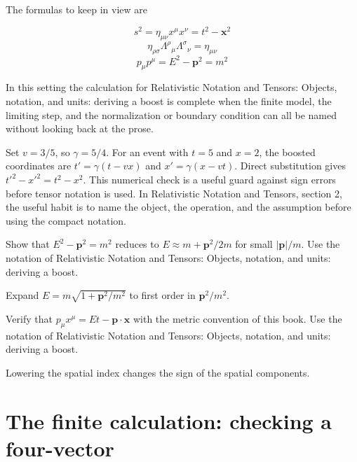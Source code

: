 The formulas to keep in view are

\[
  s^2=\eta_{\mu\nu}x^\mu x^\nu=t^2-\bm x^2
\]
\[
  \eta_{\rho\sigma}\Lambda^\rho{}_\mu\Lambda^\sigma{}_\nu=\eta_{\mu\nu}
\]
\[
  p_\mu p^\mu=E^2-\bm p^2=m^2
\]

In this setting the calculation for Relativistic Notation and Tensors: Objects, notation, and units: deriving a boost is complete when the finite model, the limiting step, and the normalization or boundary condition can all be named without looking back at the prose.




\begin{example}
Set \(v=3/5\), so \(\gamma=5/4\).  For an event with \(t=5\) and \(x=2\), the boosted coordinates are \(t'=\gamma(t-vx)\) and \(x'=\gamma(x-vt)\).  Direct substitution gives \(t'^2-x'^2=t^2-x^2\).  This numerical check is a useful guard against sign errors before tensor notation is used.  In Relativistic Notation and Tensors, section 2, the useful habit is to name the object, the operation, and the assumption before using the compact notation.
\end{example}



\begin{exercise}
Show that \(E^2-\bm p^2=m^2\) reduces to \(E\approx m+\bm p^2/2m\) for small \(|\bm p|/m\).  Use the notation of Relativistic Notation and Tensors: Objects, notation, and units: deriving a boost.
\begin{answer}
Expand \(E=m\sqrt{1+\bm p^2/m^2}\) to first order in \(\bm p^2/m^2\).
\end{answer}
\end{exercise}

\begin{exercise}
Verify that \(p_\mu x^\mu=Et-\bm p\cdot\bm x\) with the metric convention of this book.  Use the notation of Relativistic Notation and Tensors: Objects, notation, and units: deriving a boost.
\begin{answer}
Lowering the spatial index changes the sign of the spatial components.
\end{answer}
\end{exercise}



\section{The finite calculation: checking a four-vector}

